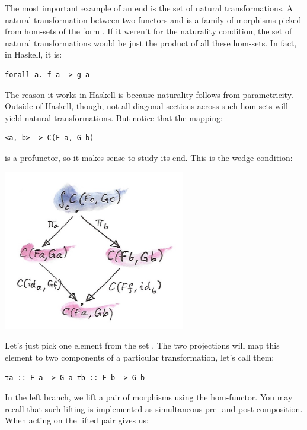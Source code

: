 The most important example of an end is the set of natural
transformations. A natural transformation between two functors
 and  is a family of morphisms picked from hom-sets
of the form . If it weren't for the naturality
condition, the set of natural transformations would be just the product
of all these hom-sets. In fact, in Haskell, it is:

\begin{verbatim}
forall a. f a -> g a
\end{verbatim}

The reason it works in Haskell is because naturality follows from
parametricity. Outside of Haskell, though, not all diagonal sections
across such hom-sets will yield natural transformations. But notice that
the mapping:

\begin{verbatim}
<a, b> -> C(F a, G b)
\end{verbatim}

is a profunctor, so it makes sense to study its end. This is the wedge
condition:

\includegraphics[width=3.12500in]{images/end1.jpg}

Let's just pick one element from the set .
The two projections will map this element to two components of a
particular transformation, let's call them:

\begin{verbatim}
τa :: F a -> G a τb :: F b -> G b
\end{verbatim}

In the left branch, we lift a pair of morphisms
 using the hom-functor. You
may recall that such lifting is implemented as simultaneous pre- and
post-composition. When acting on  the lifted pair gives us:

